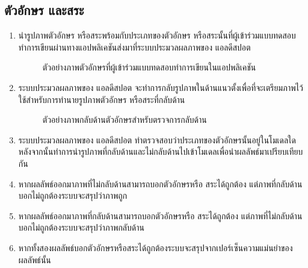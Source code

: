\documentclass[12pt,oneside,openright,a4paper]{cpe-thai-project}
\begin{document}
\subsection{ตัวอักษร และสระ }
        \begin{enumerate}
          \item นำรูปภาพตัวอักษร หรือสระพร้อมกับประเภทของตัวอักษร หรือสระนั้นที่ผู้เข้าร่วมแบบทดสอบทำการเขียนผ่านทางแอปพลิเคชันส่งมาที่ระบบประมวลผลภาพของ แอลดีสปอต
          \begin{figure}[!h]
            \centering
            \setlength{\fboxrule}{0.2mm} %
            \setlength{\fboxsep}{1cm}
            \caption{ตัวอย่างภาพตัวอักษรที่ผู้เข้าร่วมแบบทดสอบทำการเขียนในแอปพลิเคชัน}\label{fig:system}                  
          \end{figure}
          \item ระบบประมวลผลภาพของ แอลดีสปอต จะทำการกลับรูปภาพในด้านแนวตั้งเพื่อที่จะเตรียมภาพไว้ใช้สำหรับการทำนายรูปภาพตัวอักษร หรือสระที่กลับด้าน
          \begin{figure}[!h]
            \centering
            \setlength{\fboxrule}{0.2mm} %
            \setlength{\fboxsep}{1cm}
            \caption{ตัวอย่างภาพกลับด้านตัวอักษรสำหรับตรวจการกลับด้าน}\label{fig:system}                  
          \end{figure}
          \item ระบบประมวลผลภาพของ แอลดีสปอต ทำตรวจสอบว่าประเภทของตัวอักษรนั้นอยู่ในโมเดลใดหลังจากนั้นทำการนำรูปภาพที่กลับด้านและไม่กลับด้านไปเข้าโมเดลเพื่อนำผลลัพธ์มาเปรียบเทียบกัน
          \item หากผลลัพธ์ออกมาภาพที่ไม่กลับด้านสามารถบอกตัวอักษรหรือ สระได้ถูกต้อง แต่ภาพที่กลับด้านบอกไม่ถูกต้องระบบจะสรุปว่าภาพถูก
          \item หากผลลัพธ์ออกมาภาพที่กลับด้านสามารถบอกตัวอักษรหรือ สระได้ถูกต้อง แต่ภาพที่ไม่กลับด้านบอกไม่ถูกต้องระบบจะสรุปว่าภาพกลับด้าน
          \item หากทั้งสองผลลัพธ์บอกตัวอักษรหรือสระได้ถูกต้องระบบจะสรุปจากเปอร์เซ็นความแม่นยำของผลลัพธ์นั้น
        \end{enumerate}  
\end{document}
